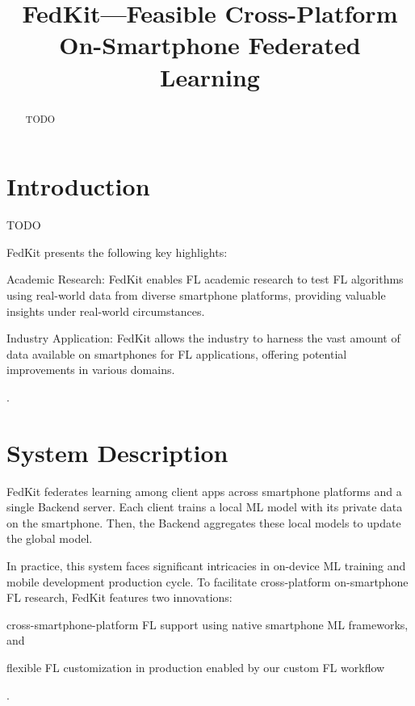 \documentclass[letterpaper]{article} %
\title{FedKit---Feasible Cross-Platform On-Smartphone Federated Learning}
\author{}
\begin{document}
\maketitle

\begin{abstract}
    TODO
\end{abstract}

\section{Introduction}


TODO

FedKit presents the following key highlights:

\begin{enumerate*}[label=\arabic*)]
    \item Academic Research: FedKit enables FL academic research to test FL algorithms using real-world data from diverse smartphone platforms, providing valuable insights under real-world circumstances.
    \item Industry Application: FedKit allows the industry to harness the vast amount of data available on smartphones for FL applications, offering potential improvements in various domains.
\end{enumerate*}.


\section{System Description}

FedKit federates learning among client apps across smartphone platforms and
a single Backend server.
Each client trains a local ML model with its private data on the smartphone.
Then, the Backend aggregates these local models to update the global model.

In practice, this system faces significant intricacies in
on-device ML training and mobile development production cycle.
To facilitate cross-platform on-smartphone FL research,
FedKit features two innovations:
\begin{enumerate*}[label=\arabic*)]
    \item cross-smartphone-platform FL support using
        native smartphone ML frameworks, and
    \item flexible FL customization in production enabled by
        our custom FL workflow
\end{enumerate*}.
\end{document}
